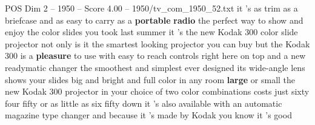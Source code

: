 \begin{textsample}{POS Dim 2 – 1950 – Score 4.00 – 1950/tv\_com\_1950\_52.txt}  \label{ex:f2_pos_009}
it 's as trim as a briefcase and as easy to carry as a \textbf{portable} \textbf{radio} the perfect way to show and enjoy the color slides you took last summer it 's the new Kodak 300 color slide projector not only is it the smartest looking projector you can buy but the Kodak 300 is a \textbf{pleasure} to use with easy to reach controls right here on top and a new readymatic changer the smoothest and simplest ever designed its wide-angle lens shows your slides big and bright and full color in any room \textbf{large} or small the new Kodak 300 projector in your choice of two color combinations costs just sixty four fifty or as little as six fifty down it 's also available with an automatic magazine type changer and because it 's made by Kodak you know it 's good

\end{textsample}
